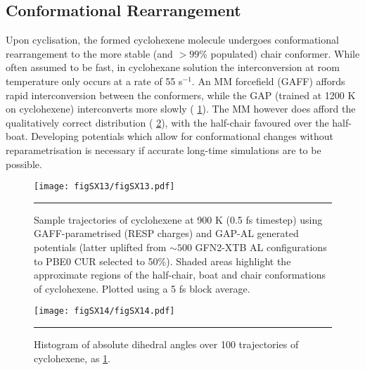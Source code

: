 \documentclass[11pt]{article}
\numberwithin{equation}{subsection}
\newcommand{\comment}[1]{}
\begin{document}
\clearpage
\subsection{Conformational Rearrangement}

\comment{
	TJW:  "interconversion differently, with an MM forcefield (GAFF), while the" - I don't understand the 'with an MM forcefield' clause
	TJW: So we see no interconversion between half-chair and chair for GAP? Do we want to run some repeats as the variation (in the MM especially) is large over 2 ps. Also 	in the caption could you mention which grey line refers to which conformation?
}

Upon cyclisation, the formed cyclohexene molecule undergoes conformational rearrangement to the more  stable (and $>99$\% populated) chair conformer. While often assumed to be fast, in cyclohexane solution the interconversion at room temperature only occurs at a rate of 55 s${}^{-1}.$\cite{Jensen1962} An MM forcefield (GAFF) affords rapid interconversion between the conformers, while the GAP (trained at 1200 K on cyclohexene) interconverts more slowly (\figurename{ \ref{fig::SX13}}). The MM however does afford the qualitatively correct distribution (\figurename{ \ref{fig::SX14}}), with the half-chair favoured over the half-boat. Developing potentials which allow for conformational changes without reparametrisation is necessary if accurate long-time simulations are to be possible.


\begin{figure}[h!]
	\centering
	\vspace{0.4cm}
	\texttt{[image: figSX13/figSX13.pdf]}
	\vspace{0.1cm}
	\hrule
	\vspace{0.1cm}
	\caption{Sample trajectories of cyclohexene at 900 K (0.5 fs timestep) using GAFF-parametrised (RESP charges) and GAP-AL generated potentials (latter uplifted from $\sim500$ GFN2-XTB AL configurations to PBE0 CUR selected to 50\%). Shaded areas highlight the approximate regions of the half-chair, boat and chair conformations of cyclohexene. Plotted using a 5 fs block average.}
	\label{fig::SX13}
\end{figure}


\begin{figure}[h!]
	\centering
	\vspace{0.4cm}
	\texttt{[image: figSX14/figSX14.pdf]}
	\vspace{0.1cm}
	\hrule
	\vspace{0.1cm}
	\caption{Histogram of absolute dihedral angles over 100 trajectories of cyclohexene, as \figurename{ \ref{fig::SX13}}.}
	\label{fig::SX14}
\end{figure}
\end{document}
